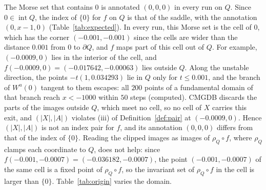 \documentclass[11pt]{article}
\theoremstyle{plain}
\theoremstyle{definition}
\theoremstyle{remark}
\DeclareMathOperator{\interior}{int}
\begin{document}
The Morse set that contains $0$ is annotated $(0,0,0)$ in every run on $Q$. Since $0\in\interior Q$, the index of $\{0\}$ for $f$ on $Q$ is that of the saddle, with the annotation $(0,x-1,0)$ (Table~\ref{tab:expected}). In every run, this Morse set is the cell of $0$, which has the corner $(-0.001,-0.001)$ since the cells are wider than the distance $0.001$ from $0$ to $\partial Q$, and $f$ maps part of this cell out of $Q$. For example, $(-0.0009,0)$ lies in the interior of the cell, and $f(-0.0009,0)=(-0.017642,-0.00063)$ lies outside $Q$. Along the unstable direction, the points $-t(1,0.034293)$ lie in $Q$ only for $t\leq0.001$, and the branch of $W^u(0)$ tangent to them escapes: all $200$ points of a fundamental domain of that branch reach $x<-1000$ within $50$ steps (computed). CMGDB discards the parts of the images outside $Q$, which meet no cell, so no cell of $X$ carries this exit, and $(|X|,|A|)$ violates (iii) of Definition~\ref{def:pair} at $(-0.0009,0)$. Hence $(|X|,|A|)$ is not an index pair for $f$, and its annotation $(0,0,0)$ differs from that of the index of $\{0\}$. Reading the clipped images as images of $\rho_Q\circ f$, where $\rho_Q$ clamps each coordinate to $Q$, does not help: since $f(-0.001,-0.0007)=(-0.036182,-0.0007)$, the point $(-0.001,-0.0007)$ of the same cell is a fixed point of $\rho_Q\circ f$, so the invariant set of $\rho_Q\circ f$ in the cell is larger than $\{0\}$. Table~\ref{tab:origin} varies the domain.
\end{document}
